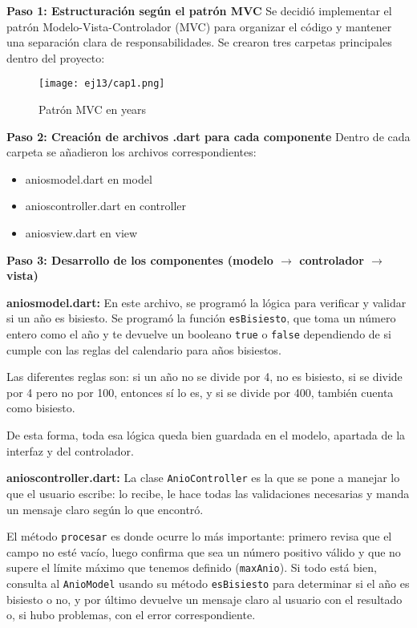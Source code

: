 \textbf{Paso 1: Estructuración según el patrón MVC}  
Se decidió implementar el patrón Modelo-Vista-Controlador (MVC) para organizar el código y mantener una separación clara de responsabilidades.  
Se crearon tres carpetas principales dentro del proyecto: 

\begin{figure}[H]
    \centering
    \texttt{[image: ej13/cap1.png]}
    \caption{Patrón MVC en years}
    \label{fig:ej13il1}
\end{figure}

\textbf{Paso 2: Creación de archivos .dart para cada componente}  
Dentro de cada carpeta se añadieron los archivos correspondientes:  
\begin{itemize}
    \item aniosmodel.dart en model
    \item anioscontroller.dart en controller
    \item aniosview.dart en view
\end{itemize}

\textbf{Paso 3: Desarrollo de los componentes (modelo $\rightarrow$ controlador $\rightarrow$ vista)}  

\textbf{aniosmodel.dart:}  
En este archivo, se programó la lógica para verificar y validar si un año es bisiesto. Se programó la función \texttt{esBisiesto}, que toma un número entero como el año y te devuelve un booleano \texttt{true} o \texttt{false} dependiendo de si cumple con las reglas del calendario para años bisiestos.

Las diferentes reglas son: si un año no se divide por 4, no es bisiesto, si se divide por 4 pero no por 100, entonces sí lo es, y si se divide por 400, también cuenta como bisiesto.

De esta forma, toda esa lógica queda bien guardada en el modelo, apartada de la interfaz y del controlador.

\textbf{anioscontroller.dart:}  
La clase \texttt{AnioController} es la que se pone a manejar lo que el usuario escribe: lo recibe, le hace todas las validaciones necesarias y manda un mensaje claro según lo que encontró.

El método \texttt{procesar} es donde ocurre lo más importante: primero revisa que el campo no esté vacío, luego confirma que sea un número positivo válido y que no supere el límite máximo que tenemos definido (\texttt{maxAnio}). Si todo está bien, consulta al \texttt{AnioModel} usando su método \texttt{esBisiesto} para determinar si el año es bisiesto o no, y por último devuelve un mensaje claro al usuario con el resultado o, si hubo problemas, con el error correspondiente.


